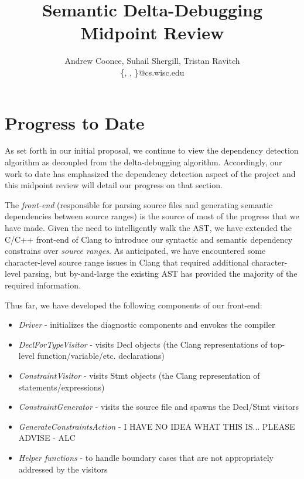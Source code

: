 \documentclass[11pt]{article}
\title{Semantic Delta-Debugging\\
Midpoint Review}
\author{Andrew Coonce, Suhail Shergill, Tristan Ravitch \\
\{\mailto{coonce}, \mailto{shergill}, \mailto{travitch}\}@cs.wisc.edu
}
\begin{document}
\maketitle

\section{Progress to Date}
As set forth in our initial proposal, we continue to view the dependency detection algorithm as decoupled from the delta-debugging algorithm. Accordingly, our work to date has emphasized the dependency detection aspect of the project and this midpoint review will detail our progress on that section.

The \emph{front-end} (responsible for parsing source files and generating semantic dependencies between source ranges) is the source of most of the progress that we have made. Given the need to intelligently walk the AST, we have extended the C/C++ front-end of Clang to introduce our syntactic and semantic dependency constrains over \emph{source ranges}. As anticipated, we have encountered some character-level source range issues in Clang that required additional character-level parsing, but by-and-large the existing AST has provided the majority of the required information.

Thus far, we have developed the following components of our front-end:

\begin{itemize}
\item{\emph{Driver} - initializes the diagnostic components and envokes the compiler}
\item{\emph{DeclForTypeVisitor} - visits Decl objects (the Clang representations of top-level function/variable/etc. declarations) }
\item{\emph{ConstraintVisitor} - visits Stmt objects (the Clang representation of statements/expressions)}
\item{\emph{ConstraintGenerator} - visits the source file and spawns the Decl/Stmt visitors}
\item{\emph{GenerateConstraintsAction} - I HAVE NO IDEA WHAT THIS IS... PLEASE ADVISE - ALC}
\item{\emph{Helper functions} - to handle boundary cases that are not appropriately addressed by the visitors}
\end{itemize}
\end{document}

